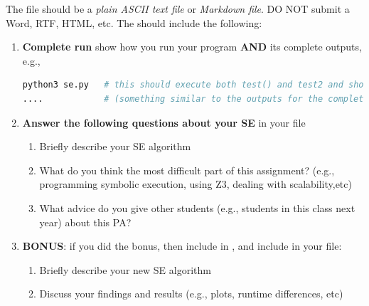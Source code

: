 The  file should be a \textit{plain ASCII text file} or \textit{Markdown file}. DO NOT submit a Word, RTF, HTML, etc. The  should include the following:

\begin{enumerate}
\item \textbf{Complete run} show how you run your program \textbf{AND} its complete outputs, e.g.,

\begin{lstlisting}[language=bash]
python3 se.py   # this should execute both test() and test2 and show all outputs 
....            # (something similar to the outputs for the complete example above)
\end{lstlisting}

\item \textbf{Answer the following questions about your SE} in your  file
    \begin{enumerate}[label=(\alph*)]
    \item Briefly describe your SE algorithm
    \item What do you think the most difficult part of this assignment?  (e.g., programming symbolic execution, using Z3, dealing with scalability,etc)
    \item What advice do you give other students (e.g., students in this class next year) about this PA?
    \end{enumerate}


\item \textbf{BONUS}: if you did the bonus, then include  in , and include in your  file:
    \begin{enumerate}[label=(\alph*)]
    \item Briefly describe your new SE algorithm
    \item Discuss your findings and results (e.g., plots, runtime differences, etc)
    \end{enumerate}
\end{enumerate}
